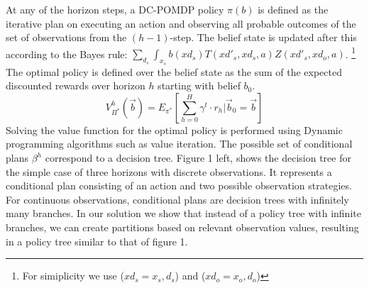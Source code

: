 \documentclass{article} %
\begin{document}
At any of the horizon steps, a DC-POMDP policy $\pi(b)$ is defined as the iterative plan on executing an action and observing all probable outcomes of the set of observations from the $(h-1)$-step. The belief state is updated after this according to the Bayes rule: $\sum_{d_s}\int_{x_s} b(xd_s)T(xd'_s,xd_s,a)Z(xd'_s,xd_o,a)$. \footnote{For simiplicity we use ($xd_s = x_s,d_s$) and ($xd_o=x_o,d_o$)}
The optimal policy is defined over the belief state as the sum of the expected discounted rewards over horizon $h$ starting with belief $b_0$.
{\footnotesize
\begin{equation}
V^h_{\Pi^*}(\vec{b}) = E_{\pi^*} \left[ \sum_{h=0}^{H} \gamma^t \cdot r_h \Big| \vec{b}_0 = \vec{b} \right]\nonumber
\end{equation}
}
Solving the value function for the optimal policy is performed using Dynamic programming algorithms such as value iteration. 
The possible set of conditional plans $\beta^h$ correspond to a decision tree. Figure 1 left, shows the decision tree for the simple case of three horizons with discrete observations. It represents a conditional plan consisting of an action and two possible observation strategies. For continuous observations, conditional plans are decision trees with infinitely many branches. In our solution we show that instead of a policy tree with infinite branches, we can create partitions based on relevant observation values, resulting in a policy tree similar to that of figure 1. %
\incmargin{.5em}
\linesnumbered
\end{document}
